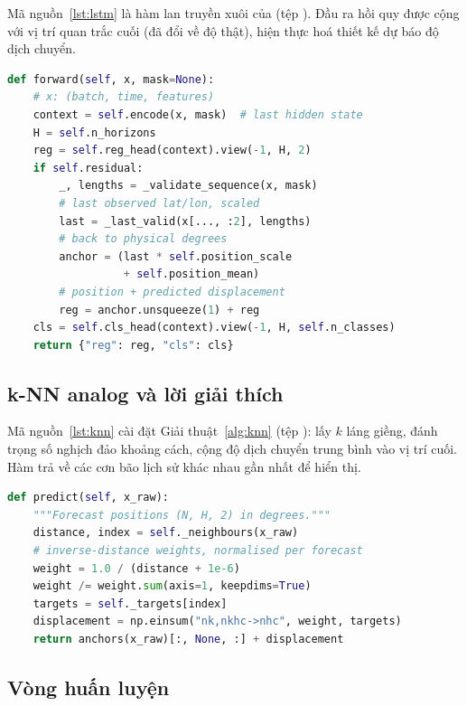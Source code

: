Mã nguồn~\ref{lst:lstm} là hàm lan truyền xuôi của 
(tệp ). Đầu ra hồi quy được cộng với vị trí
quan trắc cuối (đã đổi về độ thật), hiện thực hoá thiết kế dự báo độ dịch chuyển.

\begin{lstlisting}[language=Python, caption={Lan truyền xuôi của mô hình LSTM (rút gọn, bỏ các đầu ra gió và khí áp).}, label={lst:lstm}]
def forward(self, x, mask=None):
    # x: (batch, time, features)
    context = self.encode(x, mask)  # last hidden state
    H = self.n_horizons
    reg = self.reg_head(context).view(-1, H, 2)
    if self.residual:
        _, lengths = _validate_sequence(x, mask)
        # last observed lat/lon, scaled
        last = _last_valid(x[..., :2], lengths)
        # back to physical degrees
        anchor = (last * self.position_scale
                  + self.position_mean)
        # position + predicted displacement
        reg = anchor.unsqueeze(1) + reg
    cls = self.cls_head(context).view(-1, H, self.n_classes)
    return {"reg": reg, "cls": cls}
\end{lstlisting}

\subsection{k-NN analog và lời giải thích}

Mã nguồn~\ref{lst:knn} cài đặt Giải thuật~\ref{alg:knn}
(tệp ): lấy $k$ láng giềng, đánh
trọng số nghịch đảo khoảng cách, cộng độ dịch chuyển trung bình vào vị trí cuối.
Hàm  trả về các cơn bão lịch sử khác nhau gần nhất để hiển thị.

\begin{lstlisting}[language=Python, caption={Dự báo của k-NN analog.}, label={lst:knn}]
def predict(self, x_raw):
    """Forecast positions (N, H, 2) in degrees."""
    distance, index = self._neighbours(x_raw)
    # inverse-distance weights, normalised per forecast
    weight = 1.0 / (distance + 1e-6)
    weight /= weight.sum(axis=1, keepdims=True)
    targets = self._targets[index]
    displacement = np.einsum("nk,nkhc->nhc", weight, targets)
    return anchors(x_raw)[:, None, :] + displacement
\end{lstlisting}

\subsection{Vòng huấn luyện}

